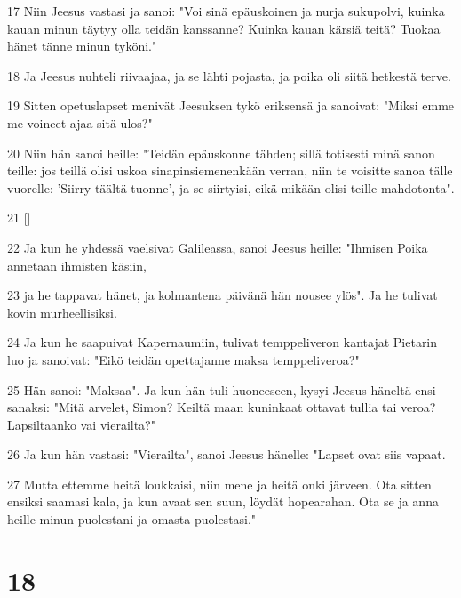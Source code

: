 \par 17 Niin Jeesus vastasi ja sanoi: "Voi sinä epäuskoinen ja nurja sukupolvi, kuinka kauan minun täytyy olla teidän kanssanne? Kuinka kauan kärsiä teitä? Tuokaa hänet tänne minun tyköni."
\par 18 Ja Jeesus nuhteli riivaajaa, ja se lähti pojasta, ja poika oli siitä hetkestä terve.
\par 19 Sitten opetuslapset menivät Jeesuksen tykö eriksensä ja sanoivat: "Miksi emme me voineet ajaa sitä ulos?"
\par 20 Niin hän sanoi heille: "Teidän epäuskonne tähden; sillä totisesti minä sanon teille: jos teillä olisi uskoa sinapinsiemenenkään verran, niin te voisitte sanoa tälle vuorelle: 'Siirry täältä tuonne', ja se siirtyisi, eikä mikään olisi teille mahdotonta".
\par 21 []
\par 22 Ja kun he yhdessä vaelsivat Galileassa, sanoi Jeesus heille: "Ihmisen Poika annetaan ihmisten käsiin,
\par 23 ja he tappavat hänet, ja kolmantena päivänä hän nousee ylös". Ja he tulivat kovin murheellisiksi.
\par 24 Ja kun he saapuivat Kapernaumiin, tulivat temppeliveron kantajat Pietarin luo ja sanoivat: "Eikö teidän opettajanne maksa temppeliveroa?"
\par 25 Hän sanoi: "Maksaa". Ja kun hän tuli huoneeseen, kysyi Jeesus häneltä ensi sanaksi: "Mitä arvelet, Simon? Keiltä maan kuninkaat ottavat tullia tai veroa? Lapsiltaanko vai vierailta?"
\par 26 Ja kun hän vastasi: "Vierailta", sanoi Jeesus hänelle: "Lapset ovat siis vapaat.
\par 27 Mutta ettemme heitä loukkaisi, niin mene ja heitä onki järveen. Ota sitten ensiksi saamasi kala, ja kun avaat sen suun, löydät hopearahan. Ota se ja anna heille minun puolestani ja omasta puolestasi."

\chapter{18}

